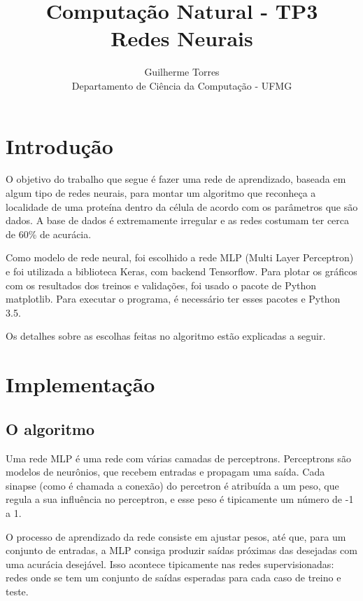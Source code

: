 \documentclass[11pt]{article}
\begin{document}
\title{Computação Natural - TP3\\Redes Neurais}
\author{Guilherme Torres\\Departamento de Ciência da Computação - UFMG}
\date{}
\maketitle

\section{Introdução}

O objetivo do trabalho que segue é fazer uma rede de aprendizado, baseada em algum tipo de redes neurais, para montar um algoritmo que reconheça a localidade de uma proteína dentro da célula de acordo com os parâmetros que são dados. A base de dados é extremamente irregular e as redes costumam ter cerca de 60\% de acurácia.

Como modelo de rede neural, foi escolhido a rede MLP (Multi Layer Perceptron) e foi utilizada a biblioteca Keras, com backend Tensorflow. Para plotar os gráficos com os resultados dos treinos e validações, foi usado o pacote de Python matplotlib. Para executar o programa, é necessário ter esses pacotes e Python 3.5.

Os detalhes sobre as escolhas feitas no algoritmo estão explicadas a seguir.

\section{Implementação}

\subsection{O algoritmo}

Uma rede MLP é uma rede com várias camadas de perceptrons. Perceptrons são modelos de neurônios, que recebem entradas e propagam uma saída. Cada sinapse (como é chamada a conexão) do percetron é atribuída a um peso, que regula a sua influência no perceptron, e esse peso é tipicamente um número de -1 a 1.

O processo de aprendizado da rede consiste em ajustar pesos, até que, para um conjunto de entradas, a MLP consiga produzir saídas próximas das desejadas com uma acurácia desejável. Isso acontece tipicamente nas redes supervisionadas: redes onde se tem um conjunto de saídas esperadas para cada caso de treino e teste.
\end{document}
